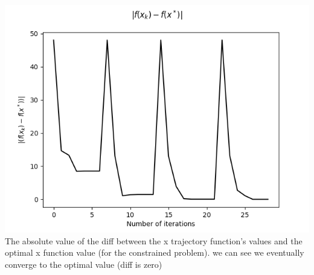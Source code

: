 \documentclass[12pt]{article}
\begin{document}
\subsubsection{}
\includegraphics[scale=0.5]{hw4/plots/plot_5.png}\\
The absolute value of the diff between the x trajectory function's values and the optimal x function value (for the constrained problem). we can see we eventually converge to the optimal value (diff is zero)\\
\end{document}
